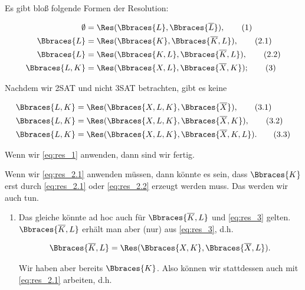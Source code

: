 \begin{solution}

Es gibt bloß folgende Formen der Resolution:

\begin{align}
    \emptyset & = \Res(\Bbraces{L}, \Bbraces{\overline L}), \label{eq:res_1} \tag{1} \\
    \Bbraces{L} & = \Res(\Bbraces{K}, \Bbraces{\overline K, L}), \label{eq:res_2.1} \tag{2.1} \\
    \Bbraces{L} & = \Res(\Bbraces{K, L}, \Bbraces{\overline K, L}), \label{eq:res_2.2} \tag{2.2} \\
    \Bbraces{L, K} & = \Res(\Bbraces{X, L}, \Bbraces{\overline X, K}); \label{eq:res_3} \tag{3}
\end{align}

Nachdem wir 2SAT und nicht 3SAT betrachten, gibt es keine

\begin{align}
    \Bbraces{L, K} & = \Res(\Bbraces{X, L, K}, \Bbraces{\overline X}), \label{eq:res_3.1} \tag{3.1} \\
    \Bbraces{L, K} & = \Res(\Bbraces{X, L, K}, \Bbraces{\overline X, K}), \label{eq:res_3.2} \tag{3.2} \\
    \Bbraces{L, K} & = \Res(\Bbraces{X, L, K}, \Bbraces{\overline X, K, L}). \label{eq:res_3.3} \tag{3.3} \\
\end{align}

Wenn wir \eqref{eq:res_1} anwenden, dann sind wir fertig.

Wenn wir \eqref{eq:res_2.1} anwenden müssen, dann könnte es sein, dass $\Bbraces{K}$ erst durch \eqref{eq:res_2.1} oder \eqref{eq:res_2.2} erzeugt werden muss.
Das werden wir auch tun.

\begin{enumerate}[label = (\arabic*), start = 0]

    \item Das gleiche könnte ad hoc auch für $\Bbraces{\overline K, L}$ und \eqref{eq:res_3} gelten.
    $\Bbraces{\overline K, L}$ erhält man aber (nur) aus \eqref{eq:res_3}, d.h.

    \begin{align*}
        \Bbraces{\overline K, L}
        =
        \Res(\Bbraces{X, K}, \Bbraces{\overline X, L}).
    \end{align*}

    Wir haben aber bereits $\Bbraces{K}$.
    Also können wir stattdessen auch mit \eqref{eq:res_2.1} arbeiten, d.h.


\end{enumerate}
\end{solution}
